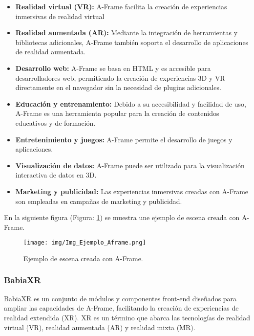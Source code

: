 \documentclass[a4paper, 12pt]{book}
\begin{document}
        \begin{itemize}
            \item \textbf{Realidad virtual (VR):} A-Frame facilita la creación de experiencias inmersivas de realidad virtual 
            
            \item \textbf{Realidad aumentada (AR):} Mediante la integración de herramientas y bibliotecas adicionales, A-Frame también soporta el desarrollo de aplicaciones de realidad aumentada.
            
            \item \textbf{Desarrollo web:} A-Frame se basa en HTML y es accesible para desarrolladores web, permitiendo la creación de experiencias 3D y VR directamente en el navegador sin la necesidad de plugins adicionales.
            
            \item \textbf{Educación y entrenamiento:} Debido a su accesibilidad y facilidad de uso, A-Frame es una herramienta popular para la creación de contenidos educativos y de formación.
            
            \item \textbf{Entretenimiento y juegos:} A-Frame permite el desarrollo de juegos y aplicaciones.
            
            \item \textbf{Visualización de datos:} A-Frame puede ser utilizado para la visualización interactiva de datos en 3D.
            
            \item \textbf{Marketing y publicidad:} Las experiencias inmersivas creadas con A-Frame son empleadas en campañas de marketing y publicidad.

        \end{itemize}
        \newpage
        En la siguiente figura (Figura: \ref{fig:Img_Ejemplo_Aframe}) se muestra une ejemplo de escena creada con A-Frame.

        \begin{figure}[H]
            \centering
            \texttt{[image: img/Img\_Ejemplo\_Aframe.png]}
            \caption{Ejemplo de escena creada con A-Frame.}
            \label{fig:Img_Ejemplo_Aframe}
        \end{figure}

        
        \subsubsection{BabiaXR}
        BabiaXR es un conjunto de módulos y componentes front-end diseñados para ampliar las capacidades de A-Frame, facilitando la creación de experiencias de realidad extendida (XR). XR es un término que abarca las tecnologías de realidad virtual (VR), realidad aumentada (AR) y realidad mixta (MR). 
        
\end{document}
